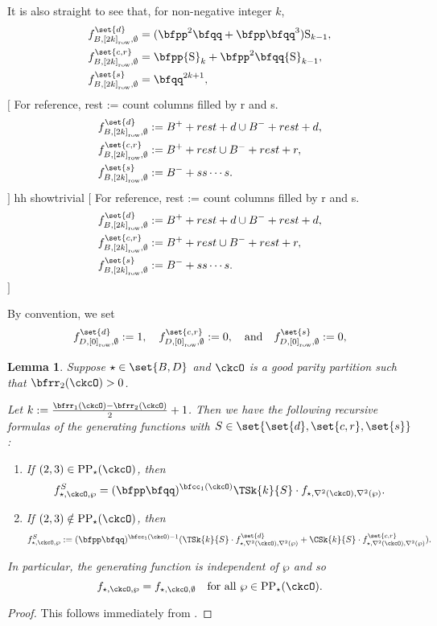 \documentclass[12pt,a4paper]{amsart}
\newcommand{\trivial}[2][]{\if\relax\detokenize{#1}\relax
  {%
      \color{orange} \vspace{0em} $[$  #2 $]$
      \color{black}
  }
  \else
\ifx#1h
\ifcsname showtrivial\endcsname
{%
    \color{orange} \vspace{0em}  $[$ #2 $]$
    \color{black}
}
\fi
\else {\red Wrong argument!} \fi
\fi
}
\newcommand{\RS}{{\mathrm {S}}}
\def\DD{\nabla}
\numberwithin{equation}{section}
\newtheorem{lem}[thm]{Lemma}
\theoremstyle{remark}
\def\DD{\nabla}
\def\AND{\quad \text{and} \quad}
\def\CPPs{\mathrm{PP}_{\star}}
\def\yrow#1{\left[#1\right]_{\mathrm{row}}}
\def\DD{\nabla}
\begin{document}
It is also straight to see that, for non-negative  integer $k$,
\[
  \begin{split}
   f_{B,\yrow{2k},\emptyset}^{\set{d}} & = (\bfpp^{2}\bfqq+ \bfpp\bfqq^{3})\RS_{k-1}, \\
   f_{B,\yrow{2k},\emptyset}^{\set{c,r}} & = \bfpp\RS_{k} + \bfpp^{2}\bfqq\RS_{k-1},  \\
  f_{B,\yrow{2k},\emptyset}^{\set{s}} & = \bfqq^{2k+1},\\
  \end{split}
\]
\trivial[h]{
  For reference, rest := count columns filled by r and s.
\[
  \begin{split}
    f_{B,\yrow{2k},\emptyset}^{\set{d}} &:=  B^{+} + rest + d \cup B^{-}+rest+d, \\
    f_{B,\yrow{2k},\emptyset}^{\set{c,r}}   &:= B^{+} + rest \cup B^{-}+rest+r, \\
    f_{B,\yrow{2k},\emptyset}^{\set{s}} & := B^{-} + ss\cdots s.\\
  \end{split}
\]
}

By convention, we set
\[
  f_{D,\yrow{0}, \emptyset}^{\set{d}} := 1, \quad
  f_{D,\yrow{0}, \emptyset}^{\set{c,r}} := 0,
  \AND
  f_{D,\yrow{0}, \emptyset}^{\set{s}} := 0,
\]

\begin{lem}\label{lem:gf.BD}
  Suppose $\star\in\set{B,D}$ and $\ckcO$ is a good parity partition such that $\bfrr_{2}(\ckcO)>0$.

  Let $k:=\frac{\bfrr_{1}(\ckcO)-\bfrr_{2}(\ckcO)}{2}+1$.
  Then we have the following  recursive formulas of the generating functions
  with $S \in \set{\set{d}, \set{c,r}, \set{s}}$:
  \begin{enumerate}[label=(\alph*)]
    \item If $(2,3)\in \CPPs(\ckcO)$, then
    \[
      f_{\star,\ckcO, \wp}^{S} = (\bfpp\bfqq)^{\bfcc_{1}(\ckcO)} \TSk{k}{S} \cdot  f_{\star,\DD^{2}(\ckcO),\DD^{2}(\wp)}.
    \]
    \item If $(2,3)\notin \CPPs(\ckcO)$,
    then
    \[
      f_{\star,\ckcO, \wp}^{S} := (\bfpp\bfqq)^{\bfcc_{1}(\ckcO)-1} (\TSk{k}{S} \cdot f_{\star,\DD^{2}(\ckcO),\DD^{2}(\wp)}^{\set{d}}
      + \CSk{k}{S} \cdot f_{\star,\DD^{2}(\ckcO),\DD^{2}(\wp)}^{\set{c,r}}).
    \]
  \end{enumerate}
  In particular, the generating function is independent of $\wp$ and so
  \[
    f_{\star,\ckcO,\wp} = f_{\star,\ckcO,\emptyset} \quad \text{for all $\wp\in \CPPs(\ckcO)$.}
  \]
\end{lem}
\begin{proof}
  This follows immediately from .
\end{proof}
\end{document}
